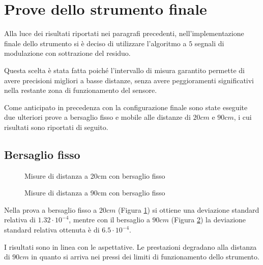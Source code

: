 \section{Prove dello strumento finale}
Alla luce dei risultati riportati nei paragrafi precedenti, nell'implementazione finale dello strumento si è deciso di utilizzare l'algoritmo a $5$ segnali di modulazione con sottrazione del residuo.

Questa scelta è stata fatta poiché l'intervallo di misura garantito permette di avere precisioni migliori a basse distanze, senza avere peggioramenti significativi nella restante zona di funzionamento del sensore.

Come anticipato in precedenza con la configurazione finale sono state eseguite due ulteriori prove a bersaglio fisso e mobile alle distanze di $20cm$ e $90cm$, i cui risultati sono riportati di seguito.

\subsection{Bersaglio fisso}
\begin{figure}
\centering
{}
\hspace{5mm}
\caption{Misure di distanza a 20cm con bersaglio fisso }\label{misfisso520}
\end{figure}

\begin{figure}
\centering
{}
\hspace{5mm}
\caption{Misure di distanza a 90cm con bersaglio fisso }\label{misfisso590}
\end{figure}

Nella prova a bersaglio fisso a $20cm$ (Figura \ref{misfisso520}) si ottiene una deviazione standard relativa di $1.32 \cdot 10^{-4}$, mentre con il bersaglio a $90cm$  (Figura \ref{misfisso590}) la deviazione standard relativa ottenuta è di $6.5 \cdot 10^{-4}$.

I risultati sono in linea con le aspettative. Le prestazioni degradano alla distanza di $90cm$ in quanto si arriva nei pressi dei limiti di funzionamento dello strumento.

